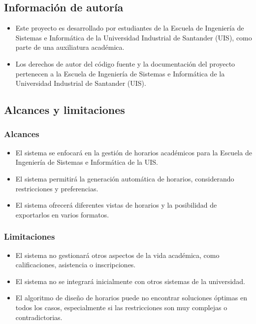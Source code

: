 \documentclass{article} %
\begin{document}
\subsection{Información de autoría}
\begin{itemize}
    \item Este proyecto es desarrollado por estudiantes de la Escuela de Ingeniería de Sistemas e Informática de la Universidad Industrial de Santander (UIS), como parte de una auxiliatura académica.
    \item Los derechos de autor del código fuente y la documentación del proyecto pertenecen a la Escuela de Ingeniería de Sistemas e Informática de la Universidad Industrial de Santander (UIS).
\end{itemize}

\subsection{Alcances y limitaciones}
    \subsubsection{Alcances}
    \begin{itemize}
        \item El sistema se enfocará en la gestión de horarios académicos para la Escuela de Ingeniería de Sistemas e Informática de la UIS.
        \item El sistema permitirá la generación automática de horarios, considerando restricciones y preferencias.
        \item El sistema ofrecerá diferentes vistas de horarios y la posibilidad de exportarlos en varios formatos.
    \end{itemize}
    
    \subsubsection{Limitaciones}
    \begin{itemize}
        \item El sistema no gestionará otros aspectos de la vida académica, como calificaciones, asistencia o inscripciones.
        \item El sistema no se integrará inicialmente con otros sistemas de la universidad.
        \item El algoritmo de diseño de horarios puede no encontrar soluciones óptimas en todos los casos, especialmente si las restricciones son muy complejas o contradictorias.
    \end{itemize}
\end{document}

